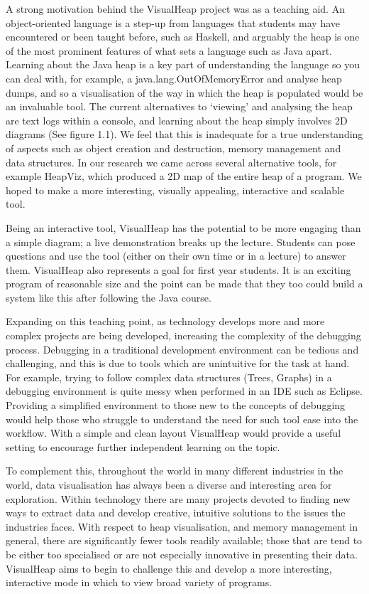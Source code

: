 \documentclass[11pt, a4paper]{report}
\begin{document}
A strong motivation behind the VisualHeap project was as a teaching aid. An object-oriented language is a step-up from languages that students may have encountered or been taught before, such as Haskell, and arguably the heap is one of the most prominent features of what sets a language such as Java apart. Learning about the Java heap is a key part of understanding the language so you can deal with, for example, a java.lang.OutOfMemoryError and analyse heap dumps, and so a visualisation of the way in which the heap is populated would be an invaluable tool. The current alternatives to ‘viewing’ and analysing the heap are text logs within a console, and learning about the heap simply involves 2D diagrams (See figure 1.1). We feel that this is inadequate for a true understanding of aspects such as object creation and destruction, memory management and data structures. In our research we came across several alternative tools, for example HeapViz, which produced a 2D map of the entire heap of a program. We hoped to make a more interesting, visually appealing, interactive and scalable tool. 

Being an interactive tool, VisualHeap has the potential to be more engaging than a simple diagram; a live demonstration breaks up the lecture. Students can pose questions and use the tool (either on their own time or in a lecture) to answer them. VisualHeap also represents a goal for first year students. It is an exciting program of reasonable size and the point can be made that they too could build a system like this after following the Java course.

Expanding on this teaching point, as technology develops more and more complex projects are being developed, increasing the complexity of the debugging process. Debugging in a traditional development environment can be tedious and challenging, and this is due to tools which are unintuitive for the task at hand. For example, trying to follow complex data structures (Trees, Graphs) in a debugging environment is quite messy when performed in an IDE such as Eclipse. Providing a simplified environment to those new to the concepts of debugging would help those who struggle to understand the need for such tool ease into the workflow. With a simple and clean layout VisualHeap would provide a useful setting to encourage further independent learning on the topic. 

To complement this, throughout the world in many different industries in the world, data visualisation has always been a diverse and interesting area for exploration. Within technology there are many projects devoted to finding new ways to extract data and develop creative, intuitive solutions to the issues the industries faces. With respect to heap visualisation, and memory management in general, there are significantly fewer tools readily available; those that are tend to be either too specialised or are not especially innovative in presenting their data. VisualHeap aims to begin to challenge this and develop a more interesting, interactive mode in which to view broad variety of programs. 
\end{document}
